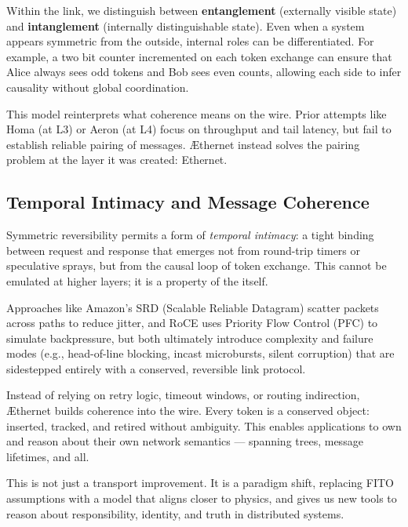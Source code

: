 \documentclass[../../../OAE-SPEC-MAIN.tex]{subfiles}
\begin{document}
Within the link, we distinguish between \textbf{entanglement} (externally visible state) and \textbf{intanglement} (internally distinguishable state). Even when a system appears symmetric from the outside, internal roles can be differentiated. For example, a two bit counter incremented on each token exchange can ensure that Alice always sees odd tokens and Bob sees even counts, allowing each side to infer causality without global coordination.

This model reinterprets what coherence means on the wire. Prior attempts like Homa (at L3) or Aeron (at L4) focus on throughput and tail latency, but fail to establish reliable pairing of messages. \AE thernet instead solves the pairing problem at the layer it was created: Ethernet.



\subsection*{Temporal Intimacy and Message Coherence}

Symmetric reversibility permits a form of \emph{temporal intimacy}: a tight binding between request and response that emerges not from round-trip timers or speculative sprays, but from the causal loop of token exchange. This cannot be emulated at higher layers; it is a property of the \LINK itself.

Approaches like Amazon’s SRD (Scalable Reliable Datagram) scatter packets across paths to reduce jitter, and RoCE uses Priority Flow Control (PFC) to simulate backpressure, but both ultimately introduce complexity and failure modes (e.g., head-of-line blocking, incast microbursts, silent corruption) that are sidestepped entirely with a conserved, reversible link protocol.

Instead of relying on retry logic, timeout windows, or routing indirection, \AE thernet builds coherence into the wire. Every token is a conserved object: inserted, tracked, and retired without ambiguity. This enables applications to own and reason about their own network semantics — spanning trees, message lifetimes, and all.

This is not just a transport improvement. It is a paradigm shift, replacing FITO assumptions with a model that aligns closer to physics, and gives us new tools to reason about responsibility, identity, and truth in distributed systems.
\end{document}
